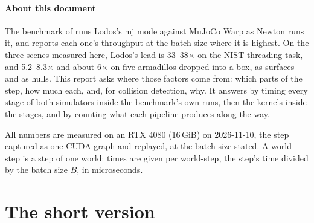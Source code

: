 



\paragraph{About this document}
The benchmark of  runs Lodos's mj mode against MuJoCo Warp as Newton runs it, and reports each one's throughput at the batch size where it is highest. On the three scenes measured here, Lodos's lead is 33--38$\times$ on the NIST threading task, and 5.2--8.3$\times$ and about 6$\times$ on five armadillos dropped into a box, as surfaces and as hulls. This report asks where those factors come from: which parts of the step, how much each, and, for collision detection, why. It answers by timing every stage of both simulators inside the benchmark's own runs, then the kernels inside the stages, and by counting what each pipeline produces along the way.

All numbers are measured on an RTX 4080 (16\,GiB) on 2026-11-10, the step captured as one CUDA graph and replayed, at the batch size stated. A world-step is a step of one world: times are given per world-step, the step's time divided by the batch size $B$, in microseconds.

\setcounter{tocdepth}{1}
\tableofcontents

\section{The short version}\label{sec:short}

